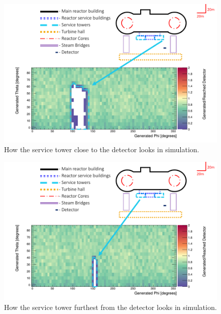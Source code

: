 \newpage
\begin{figure}[htbp]
  \centering
  \begin{turn}{-90}
  \begin{minipage}{9in}
  \centering
    \includegraphics[scale = 0.8]{Chapter5/Figs/wylfaRasterNew/serviceTowerCloseGen_Reached.png}
  \caption{How the service tower close to the detector looks in simulation.}
  \label{fig:serviceTowerCloseGen_Reached}
  \end{minipage}
  \end{turn}
\end{figure}


\newpage
\begin{figure}[htbp]
  \centering
  \begin{turn}{-90}
  \begin{minipage}{9in}
  \centering
    \includegraphics[scale = 0.8]{Chapter5/Figs/wylfaRasterNew/serviceTowerFarGen_Reached.png}
  \caption{How the service tower furthest from the detector looks in simulation.}
  \label{fig:serviceTowerFarGen_Reached}
  \end{minipage}
  \end{turn}
\end{figure}

